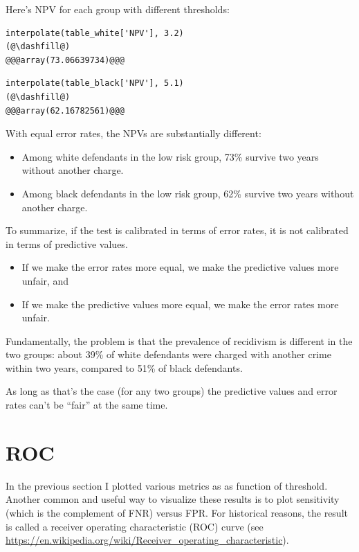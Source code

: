 Here's NPV for each group with different thresholds:

\begin{lstlisting}[]
interpolate(table_white['NPV'], 3.2)
(@\dashfill@)
@@@array(73.06639734)@@@
\end{lstlisting}

\begin{lstlisting}[]
interpolate(table_black['NPV'], 5.1)
(@\dashfill@)
@@@array(62.16782561)@@@
\end{lstlisting}

With equal error rates, the NPVs are substantially different:

\begin{itemize}
\item
  Among white defendants in the low risk group, 73\% survive two years
  without another charge.
\item
  Among black defendants in the low risk group, 62\% survive two years without another charge.
\end{itemize}

To summarize, if the test is calibrated in terms of error rates, it is
not calibrated in terms of predictive values.

\begin{itemize}
\item
  If we make the error rates more equal, we make the predictive values
  more unfair, and
\item
  If we make the predictive values more equal, we make the error rates
  more unfair.
\end{itemize}

Fundamentally, the problem is that the prevalence of recidivism is
different in the two groups: about 39\% of white defendants were charged
with another crime within two years, compared to 51\% of black
defendants.

As long as that's the case (for any two groups) the predictive values
and error rates can't be ``fair'' at the same time.

\hypertarget{roc}{%
\section{ROC}\label{roc}}

In the previous section I plotted various metrics as as function of
threshold. Another common and useful way to visualize these results is
to plot sensitivity (which is the complement of FNR) versus FPR. For
historical reasons, the result is called a receiver operating
characteristic (ROC) curve (see
\url{https://en.wikipedia.org/wiki/Receiver_operating_characteristic}).

